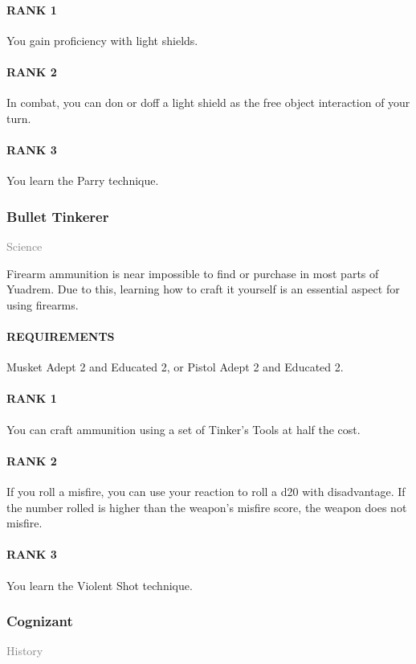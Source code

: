 \paragraph{RANK 1} You gain proficiency with light shields.
\paragraph{RANK 2} In combat, you can don or doff a light shield as the free object interaction of your turn.
\paragraph{RANK 3} You learn the Parry technique.

\subsubsection{Bullet Tinkerer} \label{feat::bullettinkerer}
\small{\textcolor{gray}{Science}}

\normalsize
Firearm ammunition is near impossible to find or purchase in most parts of Yuadrem.
Due to this, learning how to craft it yourself is an essential aspect for using firearms.
\paragraph{REQUIREMENTS} Musket Adept 2 and Educated 2, or Pistol Adept 2 and Educated 2.
\paragraph{RANK 1} You can craft ammunition using a set of Tinker's Tools at half the cost.
\paragraph{RANK 2} If you roll a misfire, you can use your reaction to roll a d20 with disadvantage.
If the number rolled is higher than the weapon's misfire score, the weapon does not misfire.
\paragraph{RANK 3} You learn the Violent Shot technique.

\subsubsection{Cognizant} \label{feat::cognizant}
\small{\textcolor{gray}{History}}

